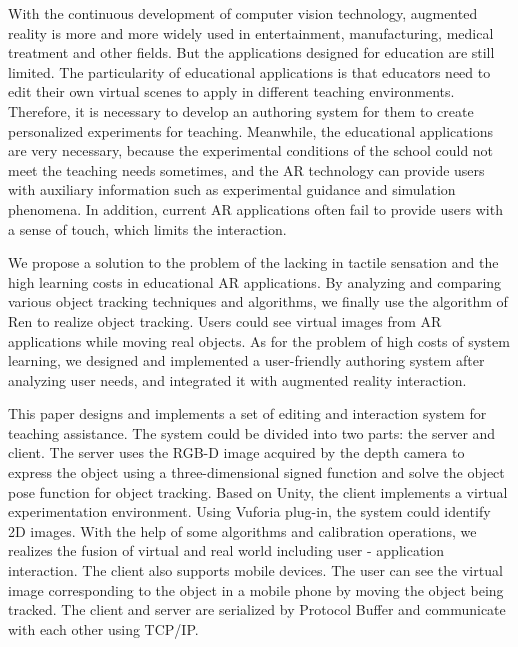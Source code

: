 \begin{englishabstract}
With the continuous development of computer vision technology, augmented reality is more and more widely used in entertainment, manufacturing, medical treatment and other fields. But the applications designed for education are still limited. The particularity of educational applications is that educators need to edit their own virtual scenes to apply in different teaching environments. Therefore, it is necessary to develop an authoring system for them to create personalized experiments for teaching. Meanwhile, the educational applications are very necessary, because the experimental conditions of the school could not meet the teaching needs sometimes, and the AR technology can provide users with auxiliary information such as experimental guidance and simulation phenomena. In addition, current AR applications often fail to provide users with a sense of touch, which limits the interaction. 

We propose a solution to the problem of the lacking in tactile sensation and the high learning costs in educational AR applications. By analyzing and comparing various object tracking techniques and algorithms, we finally use the algorithm of Ren\cite{ren2017real} to realize object tracking. Users could see virtual images from AR applications while moving real objects. As for the problem of high costs of system learning, we designed and implemented a user-friendly authoring system after analyzing user needs, and integrated it with augmented reality interaction.

This paper designs and implements a set of editing and interaction system for teaching assistance. The system could be divided into two parts: the server and client. The server uses the RGB-D image acquired by the depth camera to express the object using a three-dimensional signed function and solve the object pose function for object tracking. Based on Unity, the client implements a virtual experimentation environment. Using Vuforia plug-in, the system could identify 2D images. With the help of some algorithms and calibration operations, we realizes the fusion of virtual and real world including user -  application interaction. The client also supports mobile devices. The user can see the virtual image corresponding to the object in a mobile phone by moving the object being tracked. The client and server are serialized by Protocol Buffer and communicate with each other using TCP/IP.

 
\end{englishabstract}

